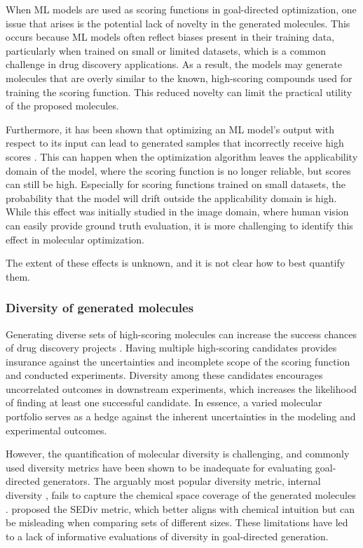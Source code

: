 When ML models are used as scoring functions in goal-directed optimization, one issue that arises is the potential lack
of novelty in the generated molecules. This occurs because ML models often reflect biases present in their training
data, particularly when trained on small or limited datasets, which is a common challenge in drug discovery
applications. As a result, the models may generate molecules that are overly similar to the known, high-scoring
compounds used for training the scoring function. This reduced novelty can limit the practical utility of
the proposed molecules.

Furthermore, it has been shown that optimizing an \ac{ML} model's output with respect to its input can lead to generated
samples that incorrectly receive high scores
\citep{szegedyIntriguingPropertiesNeural2014,goodfellowExplainingHarnessingAdversarial2015}. This can happen when the
optimization algorithm leaves the applicability domain of the model, where the scoring function is no longer reliable,
but scores can still be high. Especially for scoring functions trained on small datasets, the probability that the model
will drift outside the applicability domain is high. While this effect was initially studied in the image domain, where
human vision can easily provide ground truth evaluation, it is more challenging to identify this effect in molecular
optimization.

The extent of these effects is unknown, and it is not clear how to best quantify them.

\subsubsection{Diversity of generated molecules}
Generating diverse sets of high-scoring molecules can increase the success chances of drug discovery
projects \citep{martinDiverseViewpointsComputational2001,gorseDiversityMedicinalChemistry2006}.
Having multiple high-scoring candidates provides insurance against the uncertainties and incomplete
scope of the scoring function and conducted experiments. Diversity among these candidates encourages
uncorrelated outcomes in downstream experiments, which increases the likelihood of finding at least
one successful candidate. In essence, a varied molecular portfolio serves as a hedge against the
inherent uncertainties in the modeling and experimental outcomes.

However, the quantification of molecular diversity is challenging, and commonly used diversity
metrics have been shown to be inadequate for evaluating goal-directed generators. The
arguably most popular diversity metric, internal diversity
\citep{benhendaChemGANChallengeDrug2017}, fails to capture the chemical space coverage
of the generated molecules
\citep{waldmanNovelAlgorithmsOptimization2000,xieHowMuchSpace2023,thomasComparisonStructureLigandbased2021}.
\citet{thomasComparisonStructureLigandbased2021} proposed the \ac{SEDiv} metric, which better aligns
with chemical intuition but can be misleading when comparing sets of different sizes. These
limitations have led to a lack of informative evaluations of diversity in goal-directed generation.

